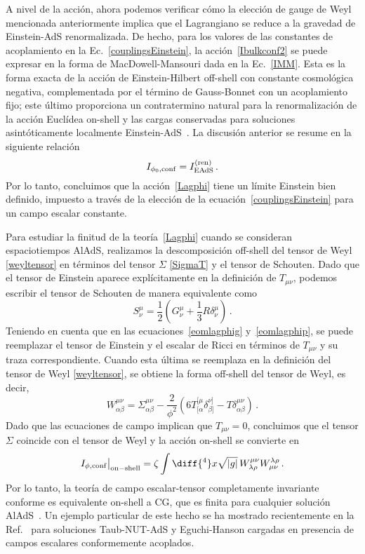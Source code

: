 \documentclass[../Main.tex]{subfiles}
\begin{document}
A nivel de la acción, ahora podemos verificar cómo la elección de gauge de Weyl mencionada anteriormente implica que el Lagrangiano se reduce a la gravedad de Einstein-AdS renormalizada. De hecho, para los valores de las constantes de acoplamiento en la Ec.~\eqref{couplingsEinstein}, la acción~\eqref{Ibulkconf2} se puede expresar en la forma de MacDowell-Mansouri dada en la Ec.~\eqref{IMM}. Esta es la forma exacta de la acción de Einstein-Hilbert off-shell con constante cosmológica negativa, complementada por el término de Gauss-Bonnet con un acoplamiento fijo; este último proporciona un contratermino natural para la renormalización de la acción Euclídea on-shell y las cargas conservadas para soluciones asintóticamente localmente Einstein-AdS~\cite{Aros:1999id,Aros:1999kt,Miskovic:2009bm}. La discusión anterior se resume en la siguiente relación
\begin{equation}
I_{\phi_{0}, \rm conf} = I^{\rm (ren)}_{\rm EAdS} \, .
\end{equation}
Por lo tanto, concluimos que la acción~\eqref{Lagphi} tiene un límite Einstein bien definido, impuesto a través de la elección de la ecuación~\eqref{couplingsEinstein} para un campo escalar constante.

Para estudiar la finitud de la teoría~\eqref{Lagphi} cuando se consideran espaciotiempos AlAdS, realizamos la descomposición off-shell del tensor de Weyl \eqref{weyltensor} en términos del tensor $\Sigma$ \eqref{SigmaT} y el tensor de Schouten. Dado que el tensor de Einstein aparece explícitamente en la definición de $T_{\mu \nu}$, podemos escribir el tensor de Schouten de manera equivalente como
\begin{equation}
S^{\mu}_{\nu} = \frac{1}{2} \left(G^{\mu}_{\nu} +\frac{1}{3}R \delta^{\mu}_{\nu}\right) \, .
\end{equation}
Teniendo en cuenta que en las ecuaciones~\eqref{eomlagphig} y~\eqref{eomlagphip}, se puede reemplazar el tensor de Einstein y el escalar de Ricci en términos de $T_{\mu\nu}$ y su traza correspondiente. Cuando esta última se reemplaza en la definición del tensor de Weyl \eqref{weyltensor}, se obtiene la forma off-shell del tensor de Weyl, es decir,
\begin{equation}\label{Weyldecomp}
    W^{\mu\nu}_{\alpha \beta} = \Sigma^{\mu\nu}_{\alpha\beta} - \frac{2}{\phi^2}\left(6T^{[\mu}_{[\alpha}\delta^{\nu]}_{\beta]} - T\delta^{\mu\nu}_{\alpha\beta} \right)\,.
\end{equation}
Dado que las ecuaciones de campo implican que $T_{\mu\nu}=0$, concluimos que el tensor $\Sigma$ coincide con el tensor de Weyl y la acción on-shell se convierte en
\begin{equation}
I_{\phi,\rm conf}\big|_{\rm on-shell} = \zeta\int\diff{^4}x\sqrt{|g|}\,W^{\mu\nu}_{\lambda\rho}W^{\lambda\rho}_{\mu\nu}\,.
\end{equation}
Por lo tanto, la teoría de campo escalar-tensor completamente invariante conforme es equivalente on-shell a CG, que es finita para cualquier solución AlAdS~\cite{Grumiller:2013mxa}. Un ejemplo particular de este hecho se ha mostrado recientemente en la Ref.~\cite{Barrientos:2022yoz} para soluciones  Taub-NUT-AdS y Eguchi-Hanson cargadas en presencia de campos escalares conformemente acoplados.
\end{document}
